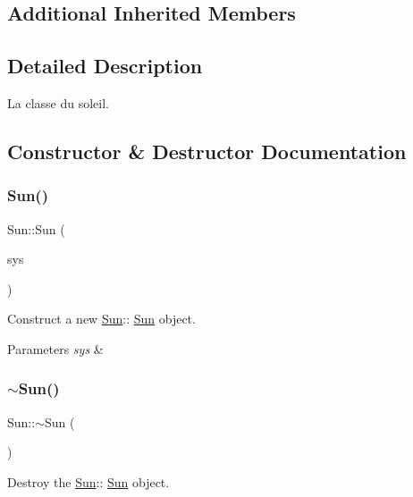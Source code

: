 \subsection*{Additional Inherited Members}


\subsection{Detailed Description}
La classe du soleil. 



\subsection{Constructor \& Destructor Documentation}
\mbox{\label{classSun_ab810283eec5c1921132cd8c2d10db9aa}} 
\subsubsection{\texorpdfstring{Sun()}{Sun()}}
{\footnotesize\ttfamily Sun\+::\+Sun (\begin{DoxyParamCaption}\item[{\mbox{\hyperlink{classSolarSystem}{Solar\+System}} $\ast$}]{sys }\end{DoxyParamCaption})}



Construct a new \mbox{\hyperlink{classSun}{Sun}}\+:\+: \mbox{\hyperlink{classSun}{Sun}} object. 


\begin{DoxyParams}{Parameters}
{\em sys} & \\
\hline
\end{DoxyParams}
\mbox{\label{classSun_a4e43fa67eca98adfb1fa900207af6120}} 
\subsubsection{\texorpdfstring{$\sim$Sun()}{~Sun()}}
{\footnotesize\ttfamily Sun\+::$\sim$\+Sun (\begin{DoxyParamCaption}{ }\end{DoxyParamCaption})}



Destroy the \mbox{\hyperlink{classSun}{Sun}}\+:\+: \mbox{\hyperlink{classSun}{Sun}} object. 




